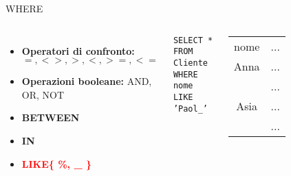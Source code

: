     \begin{frame}{WHERE}
    \begin{columns}[T,onlytextwidth]
    \begin{itemize}
        \item \textbf{Operatori di confronto:} $=, <>, >, <, >=, <=$
        \item \textbf{Operazioni booleane:} AND, OR, NOT
        \item \textbf{BETWEEN}
        \item \textbf{IN}
        \item \textbf{\textcolor{red}{LIKE\{ \%, \_ \}}}
    \end{itemize}
    \vspace{2em}
    \texttt{SELECT * \\FROM Cliente\\WHERE nome LIKE 'Paol\_'}
    \centering
    \begin{table}[h]
    \centering
    \begin{tabular}{|c|c|}
    \hline
    \rowcolor{cyan!30}\multicolumn{2}{|c|}{Cliente} \\
    \hline
    \rowcolor{cyan!30}nome &  ...  \\
    \hline
    Anna &  ... \\
    \cellcolor{red!20}{Paolo} &  ...  \\
    Asia &  ...  \\
    \cellcolor{red!20}{Paola} &  ...  \\
    \hline
    \end{tabular}
    \end{table}
    \end{columns}
    \end{frame}